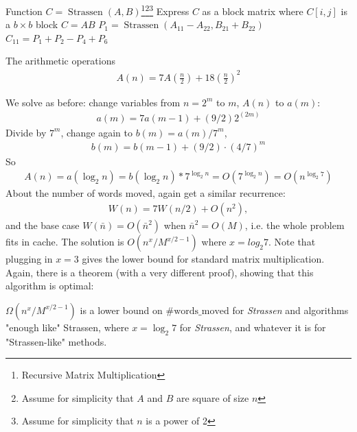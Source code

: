 \documentclass[11pt]{article}
\numberwithin{equation}{section}
\begin{document}
\begin{savenotes}
    \begin{algorithmfrm}
        \begin{algorithmic}[1]
            \State Function $C = \operatorname{Strassen}(A,B)$\footnote{Recursive Matrix Multiplication}\footnote{Assume for simplicity that $A$ and $B$ are square of size $n$}\footnote{Assume for simplicity that $n$ is a power of 2}
            \State Express $C$ as a block matrix where $C[i,j]$ is a $b \times b$ block 
                \State $C=AB$
            \Else 
                \State $P_1=\operatorname{Strassen}(A_{11}-A_{22}, B_{21}+B_{22})$ 
                \State $C_{11}=P_1+P_2-P_4+P_6$ 
            \EndIf 
        \end{algorithmic}
    \end{algorithmfrm}
\end{savenotes}

The arithmetic operations \begin{align*}
    A(n) = 7 A\left(\frac{n}{2}\right)+18\left(\frac{n}{2}\right)^{2}
\end{align*}

We solve as before: change variables from $n=2^m$ to $m$, $A(n)$ to $a(m)$:\begin{align*}
    a(m) = 7a(m-1) + (9/2)2^(2m)
\end{align*}
Divide by $7^m$, change again to $b(m) = a(m)/7^m$, \begin{align*}
    b(m) = b(m-1) + (9/2) \cdot (4/7)^m
\end{align*}
So \begin{align*}
    A(n) = a\left(\log_{2} n\right) = b\left(\log_{2} n\right)*7^{\log_{2} n} = O(7^{\log_{2} n}) = O(n^{\log_{2} 7})
\end{align*} 
 About the number of words moved, again get a similar recurrence: \begin{align*}
    W(n) = 7W(n/2) + O(n^2),
 \end{align*}
and the base case $W(\bar{n}) = O(\bar{n}^2)$ when $\bar{n}^2 = O(M)$, i.e. the whole problem fits in cache.
The solution is $O(n^x/M^{x/2 -1})$ where $x = log_2 7$.
Note that plugging in $x=3$ gives the lower bound for standard matrix multiplication. Again, there is a theorem (with a very different proof), 
showing that this algorithm is optimal:
\begin{theorem}
    $\Omega(n^x/M^{x/2 - 1})$ is a lower bound on $\#\mathrm{words\_moved}$ for \textit{Strassen} and algorithms "enough like" Strassen, where $x = \log_2 7$ for \textit{Strassen}, and whatever it is for "Strassen-like" methods.
\end{theorem}
\end{document}

